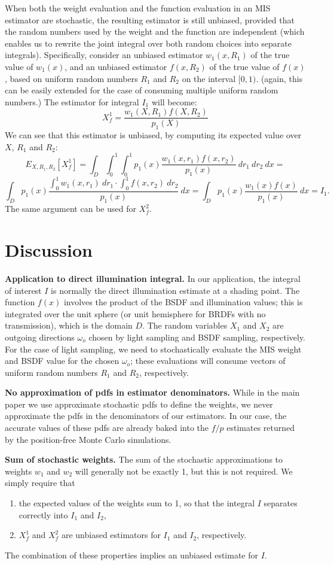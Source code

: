 \documentclass[11pt]{article}
\begin{document}
When both the weight evaluation and the function evaluation in an MIS estimator are stochastic, the resulting estimator is still unbiased, provided that the random numbers used by the weight and the function are independent (which enables us to rewrite the joint integral over both random choices into separate integrals). Specifically, consider an unbiased estimator $w_1(x,R_1)$ of the true value of $w_1(x)$, and an unbiased estimator $f(x,R_2)$ of the true value of $f(x)$, based on uniform random numbers $R_1$ and $R_2$ on the interval $[0,1)$. (again, this can be easily extended for the case of consuming multiple uniform random numbers.) The estimator for integral $I_1$ will become:
\[
X_f^1 = \frac{w_1(X,R_1) f(X,R_2)}{p_1(X)}
\]
We can see that this estimator is unbiased, by computing its expected value over $X$, $R_1$ and $R_2$:
\[
E_{X,R_1,R_2}[X_f^1] =
\int_D \int_0^1 \int_0^1 p_1(x) \frac{w_1(x,r_1) f(x,r_2)}{p_1(x)} \ dr_1 \ dr_2 \ dx =
\]
\[
\int_D  p_1(x) \frac{\int_0^1 w_1(x,r_1) \ dr_1 \cdot \int_0^1 f(x,r_2) \ dr_2}{p_1(x)} \ dx =
\int_D  p_1(x) \frac{w_1(x) f(x)}{p_1(x)} \ dx = I_1.
\]
The same argument can be used for $X_f^2$.


\section{Discussion}

{\bf Application to direct illumination integral.} In our application, the integral of interest $I$ is normally the direct illumination estimate at a shading point. The function $f(x)$ involves the product of the BSDF and illumination values; this is integrated over the unit sphere (or unit hemisphere for BRDFs with no transmission), which is the domain $D$. The random variables $X_1$ and $X_2$ are outgoing directions $\omega_o$ chosen by light sampling and BSDF sampling, respectively. For the case of light sampling, we need to stochastically evaluate the MIS weight and BSDF value for the chosen $\omega_o$; these evaluations will consume vectors of uniform random numbers $R_1$ and $R_2$, respectively.

{\bf No approximation of pdfs in estimator denominators.} While in the main paper we use approximate stochastic pdfs to define the weights, we never approximate the pdfs in the denominators of our estimators. In our case, the accurate values of these pdfs are already baked into the $f/p$ estimates returned by the position-free Monte Carlo simulations.

{\bf Sum of stochastic weights.} The sum of the stochastic approximations to weights $w_1$ and $w_2$ will generally not be exactly 1, but this is not required. We simply require that
\begin{enumerate}
    \item the expected values of the weights sum to 1, so that the integral $I$ separates correctly into $I_1$ and $I_2$,
    \item $X_f^1$ and $X_f^2$ are unbiased estimators for $I_1$ and $I_2$, respectively.
\end{enumerate}
The combination of these properties implies an unbiased estimate for $I$.
\end{document}
